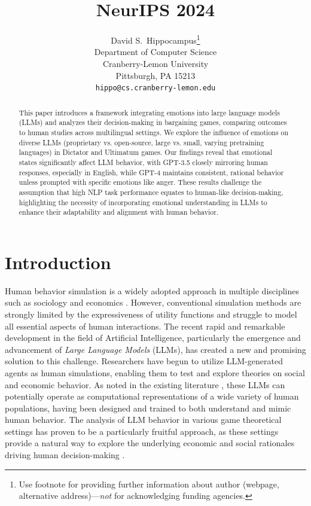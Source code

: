 \documentclass{article}
\title{NeurIPS 2024}
\author{%
  David S.~Hippocampus\thanks{Use footnote for providing further information
    about author (webpage, alternative address)---\emph{not} for acknowledging
    funding agencies.} \\
  Department of Computer Science\\
  Cranberry-Lemon University\\
  Pittsburgh, PA 15213 \\
  \texttt{hippo@cs.cranberry-lemon.edu} \\
}
\begin{document}
\maketitle


\begin{abstract}
This paper introduces a framework integrating emotions into large language models (LLMs) and analyzes their decision-making in bargaining games, comparing outcomes to human studies across multilingual settings. We explore the influence of emotions on diverse LLMs (proprietary vs. open-source, large vs. small, varying pretraining languages) in Dictator and Ultimatum games. Our findings reveal that emotional states significantly affect LLM behavior, with GPT-3.5 closely mirroring human responses, especially in English, while GPT-4 maintains consistent, rational behavior unless prompted with specific emotions like anger. These results challenge the assumption that high NLP task performance equates to human-like decision-making, highlighting the necessity of incorporating emotional understanding in LLMs to enhance their adaptability and alignment with human behavior.
\end{abstract}


\section{Introduction}

Human behavior simulation is a widely adopted approach in multiple disciplines such as sociology and economics \cite{ziems2024can}. However, conventional simulation methods are strongly limited by the expressiveness of utility functions \cite{xie2024can} and struggle to model all essential aspects of human interactions. The recent rapid and remarkable development in the field of Artificial Intelligence, particularly the emergence and advancement of \textit{Large Language Models} (LLMs), has created a new and promising solution to this challenge. Researchers have begun to utilize LLM-generated agents \cite{openai2023gpt4,wu2023autogen, chen2023agentverse, park2023generative} as human simulations, enabling them to test and explore theories on social and economic behavior. As noted in the existing literature \cite{aher2023using, argRePEc:cup:polals:v:31:y:2023:i:3:p:337-351_5}, these LLMs can potentially operate as computational representations of a wide variety of human populations, having been designed and trained to both understand and mimic human behavior. The analysis of LLM behavior in various game theoretical settings has proven to be a particularly fruitful approach, as these settings provide a natural way to explore the underlying economic and social rationales driving human decision-making \cite{akata2023playing,horton2023large,aher2023using}.
\end{document}
